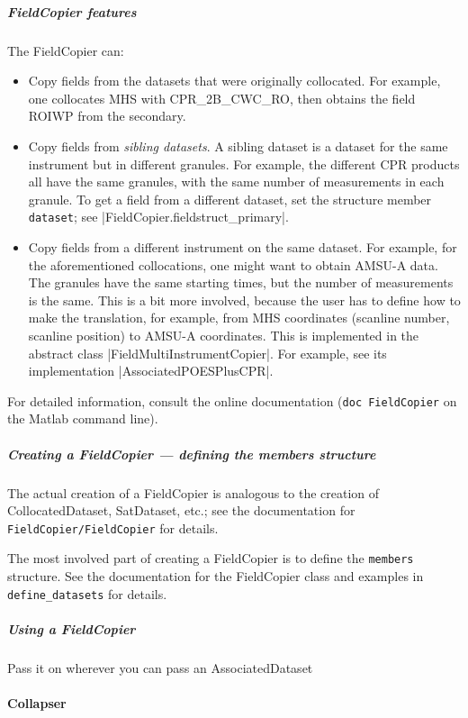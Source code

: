 \documentclass[a4paper,10pt]{article}
\begin{document}
\subparagraph{FieldCopier features}

The FieldCopier can:

\begin{itemize}
\item Copy fields from the datasets that were originally collocated.
For example, one collocates MHS with CPR\_2B\_CWC\_RO, then obtains the
field ROIWP from the secondary.
\item Copy fields from \emph{sibling datasets}.
A sibling dataset is a dataset for the same instrument but in different
granules.
For example, the different CPR products all have the same granules, with
the same number of measurements in each granule.
To get a field from a different dataset, set the structure member
\lstinline|dataset|; see \lst|FieldCopier.fieldstruct_primary|.
\item Copy fields from a different instrument on the same dataset.
For example, for the aforementioned collocations, one might want to obtain
AMSU-A data.
The granules have the same starting times, but the number of measurements
is the same.
This is a bit more involved, because the user has to define how to make
the translation, for example, from MHS coordinates (scanline number,
scanline position) to AMSU-A coordinates.
This is implemented in the abstract class
\lst|FieldMultiInstrumentCopier|.
For example, see its implementation \lst|AssociatedPOESPlusCPR|.
\end{itemize}

For detailed information, consult the online documentation
(\lstinline|doc FieldCopier| on the Matlab command line).

\subparagraph{Creating a FieldCopier --- defining the members structure}

The actual creation of a FieldCopier is analogous to the creation of
CollocatedDataset, SatDataset, etc.; see the documentation for
\lstinline|FieldCopier/FieldCopier| for details.

The most involved part of creating a FieldCopier is to define the
\lstinline|members| structure.
See the documentation for the FieldCopier class and examples in
\lstinline|define_datasets| for details.

\subparagraph{Using a FieldCopier}

Pass it on wherever you can pass an AssociatedDataset

\paragraph{Collapser}
\end{document}
